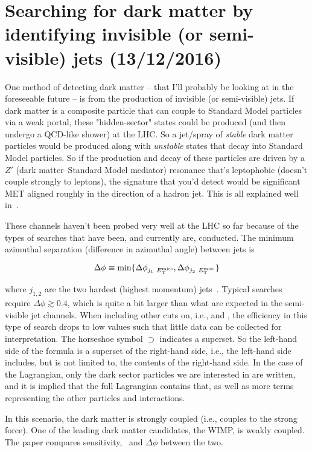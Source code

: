
\chapter{Searching for dark matter by identifying invisible (or semi-visible) jets (13/12/2016)}
\label{sec:svjoverview}

One method of detecting dark matter -- that I'll probably be looking at in the foreseeable future -- is from the production of invisible (or semi-visible) jets. If dark matter is a composite particle that can couple to Standard Model particles via a weak portal, these "hidden-sector" states could be produced (and then undergo a QCD-like shower) at the LHC. So a jet/spray of \emph{stable} dark matter particles would be produced along with \emph{unstable} states that decay into Standard Model particles. So if the production and decay of these particles are driven by a $Z'$ (dark matter--Standard Model mediator) resonance that's leptophobic (doesn't couple strongly to leptons), the signature that you'd detect would be significant MET aligned roughly in the direction of a hadron jet. This is all explained well in~\cite{Cohen:2015toa}.

These channels haven't been probed very well at the LHC so far because of the types of searches that have been, and currently are, conducted. The minimum azimuthal separation (difference in azimuthal angle) between jets is

\begin{equation}
\Delta\phi \equiv \min \{ \Delta\phi_{j_1 \ E_{\mathrm{T}}^{\text{miss}}}, \Delta\phi_{j_2 \ E_{\mathrm{T}}^{\text{miss}}} \}
\end{equation}

where $j_{1, 2}$ are the two hardest (highest momentum) jets~\cite{Cohen:2015toa}. Typical searches require $\Delta\phi \gtrsim 0.4$, which is quite a bit larger than what are expected in the semi-visible jet channels. When including other cuts on, i.e., \etmiss and \alphat, the efficiency in this type of search drops to low values such that little data can be collected for interpretation. The horseshoe symbol $\supset$ indicates a superset. So the left-hand side of the formula is a superset of the right-hand side, i.e., the left-hand side includes, but is not limited to, the contents of the right-hand side. In the case of the Lagrangian, only the dark sector particles we are interested in are written, and it is implied that the full Lagrangian contains that, as well as more terms representing the other particles and interactions.

In this scenario, the dark matter is strongly coupled (i.e., couples to the strong force). One of the leading dark matter candidates, the WIMP, is weakly coupled. The paper compares sensitivity, \etmiss\ and $\Delta\phi$ between the two.

